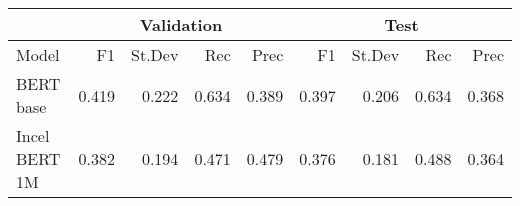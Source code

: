 \begin{tabular}{l|rrrr|rrrr}
\hline
                         &  \multicolumn{4}{c|}{Validation}             & \multicolumn{4}{c}{Test} \\
\hline
                   Model &      F1 &      St.Dev &   Rec & Prec &       F1 &       St.Dev &  Rec   &  Prec \\
\hline
               BERT base &   0.419 &       0.222 &    0.634 &     0.389 &    0.397 &        0.206 &     0.634 &      0.368 \\
           Incel BERT 1M &   0.382 &       0.194 &    0.471 &     0.479 &    0.376 &        0.181 &     0.488 &      0.364 \\
\hline
\end{tabular}
